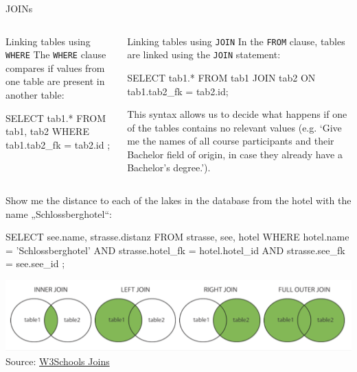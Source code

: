 \begin{frame}{JOINs}

\begin{columns}
\begin{block}{Linking tables using \texttt{WHERE}}\small
The \texttt{WHERE} clause compares if values from one table are present in another table: 
\begin{sqlcode}
SELECT tab1.* FROM tab1, tab2 
WHERE tab1.tab2_fk = tab2.id ; 
\end{sqlcode}
\end{block}

\begin{block}{Linking tables using \texttt{JOIN}}\footnotesize
In the \texttt{FROM} clause, tables are linked using the \texttt{JOIN} statement:
\begin{sqlcode}
SELECT tab1.* FROM tab1 
JOIN tab2 
ON tab1.tab2_fk = tab2.id; 
\end{sqlcode}

This syntax allows us to decide what happens if one of the tables contains no relevant values (e.g. `Give me the names of all course participants and their Bachelor field of origin, in case they already have a Bachelor's degree.').
\end{block}
\end{columns}

\framebreak

\small
Show me the distance to each of the lakes in the database from the hotel with the name „Schlossberghotel“:
\begin{sqlcode}
SELECT see.name, strasse.distanz 
FROM strasse, see, hotel 
WHERE hotel.name = 'Schlossberghotel' 
    AND strasse.hotel_fk = hotel.hotel_id 
    AND strasse.see_fk = see.see_id ;
\end{sqlcode}

\includegraphics[width=\textwidth]{img/sql-joins-w3.png}
{\scriptsize
Source: \href{https://www.w3schools.com/sql/sql_join.asp}{W3Schools Joins}
}

\framebreak



\end{frame}
